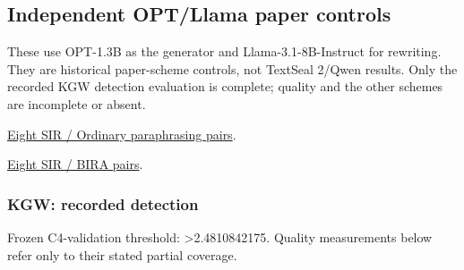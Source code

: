 \subsection{Independent OPT/Llama paper
controls}\label{record-docs-watermarking-historical-md-independent-optllama-paper-controls}

These use OPT-1.3B as the generator and Llama-3.1-8B-Instruct for
rewriting. They are historical paper-scheme controls, not TextSeal
2/Qwen results. Only the recorded KGW detection evaluation is complete;
quality and the other schemes are incomplete or absent.

\href{records/docs/watermarking/qualitative/paper-sir-vanilla.tex}{Eight
SIR / Ordinary paraphrasing pairs}.

\href{records/docs/watermarking/qualitative/paper-sir-bira.tex}{Eight
SIR / BIRA pairs}.

\subsubsection{KGW: recorded
detection}\label{record-docs-watermarking-historical-md-kgw-recorded-detection}

Frozen C4-validation threshold: \textgreater2.4810842175. Quality
measurements below refer only to their stated partial coverage.

